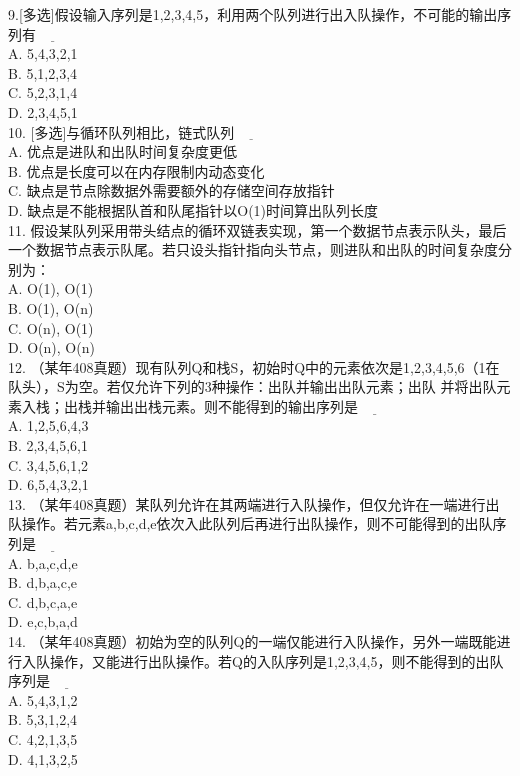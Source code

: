 \begin{exercise}
    9.[多选]假设输入序列是1,2,3,4,5，利用两个队列进行出入队操作，不可能的输出序列有$\underline{\hspace{1cm}}$\\
A. 5,4,3,2,1\\
B. 5,1,2,3,4\\
C. 5,2,3,1,4\\
D. 2,3,4,5,1\\

    10. [多选]与循环队列相比，链式队列$\underline{\hspace{1cm}}$\\
A. 优点是进队和出队时间复杂度更低\\
B. 优点是长度可以在内存限制内动态变化\\
C. 缺点是节点除数据外需要额外的存储空间存放指针\\
D. 缺点是不能根据队首和队尾指针以O(1)时间算出队列长度\\

    11. 假设某队列采用带头结点的循环双链表实现，第一个数据节点表示队头，最后一个数据节点表示队尾。若只设头指针指向头节点，则进队和出队的时间复杂度分别为：\\
A. O(1), O(1) \\
B. O(1), O(n)\\
C. O(n), O(1)\\
D. O(n), O(n)\\

    12. （某年408真题）现有队列Q和栈S，初始时Q中的元素依次是1,2,3,4,5,6（1在队头），S为空。若仅允许下列的3种操作：出队并输出出队元素；出队
    并将出队元素入栈；出栈并输出出栈元素。则不能得到的输出序列是$\underline{\hspace{1cm}}$\\
A. 1,2,5,6,4,3\\
B. 2,3,4,5,6,1\\
C. 3,4,5,6,1,2\\
D. 6,5,4,3,2,1\\

    13. （某年408真题）某队列允许在其两端进行入队操作，但仅允许在一端进行出队操作。若元素a,b,c,d,e依次入此队列后再进行出队操作，则不可能得到的出队序列是$\underline{\hspace{1cm}}$\\
A. b,a,c,d,e\\
B. d,b,a,c,e\\
C. d,b,c,a,e\\
D. e,c,b,a,d\\

    14. （某年408真题）初始为空的队列Q的一端仅能进行入队操作，另外一端既能进行入队操作，又能进行出队操作。若Q的入队序列是1,2,3,4,5，则不能得到的出队序列是$\underline{\hspace{1cm}}$\\
A. 5,4,3,1,2\\
B. 5,3,1,2,4\\
C. 4,2,1,3,5\\
D. 4,1,3,2,5\\


\end{exercise}
